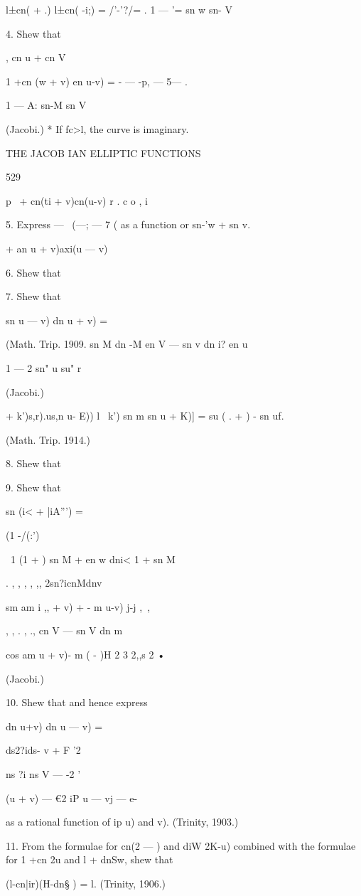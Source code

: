  l±cn( + .) l±cn( -i;) = /'-'?/= . 1 — '= sn w sn- V

4. Shew that

, cn u + cn V

1 +cn (w + v) en u-v) = - — -p, — 5— .

  1 — A: sn-M sn V

(Jacobi.) * If fc>l, the curve is imaginary.

THE JACOB IAN ELLIPTIC FUNCTIONS

529

p \ + cn(ti + v)cn(u-v) r . c o , i

5. Express — \ (—; — 7 ( as a function or sn-'w + sn v.

   + an u + v)axi(u — v)

6. Shew that

7. Shew that

sn u — v) dn u + v) =

(Math. Trip. 1909. sn M dn -M en V — sn v dn i? en u

1 — 2 sn" u su" r

(Jacobi.)

    + k')s,r).us,n u- E)) l~ k') sn m sn u + K)] = su ( . + ) - sn uf.

(Math. Trip. 1914.)

8. Shew that

9. Shew that

sn (i< + |iA''') =

(1 -/(:')

\ 1 (1 + ) sn M + en w dni< 1 + sn M

. , , , , ,, 2sn?icnMdnv

sm am i ,, + v) + - m u-v) j-j ,~,

, , . , ., cn V — sn V dn m

cos am u + v)- m ( - )H 2 3 2,,s 2 •

(Jacobi.)

10. Shew that and hence express

dn u+v) dn u — v) =

ds2?ids- v + F '2

ns ?i ns V — -2 '

(u + v) — €2 iP u — vj — e-

as a rational function of ip u) and v). (Trinity, 1903.)

11. From the formulae for cn(2 — ) and diW 2K-u) combined with the
formulae for 1 +cn 2u and l + dnSw, shew that

(l-cn|ir)(H-dn§ ) = l. (Trinity, 1906.)

